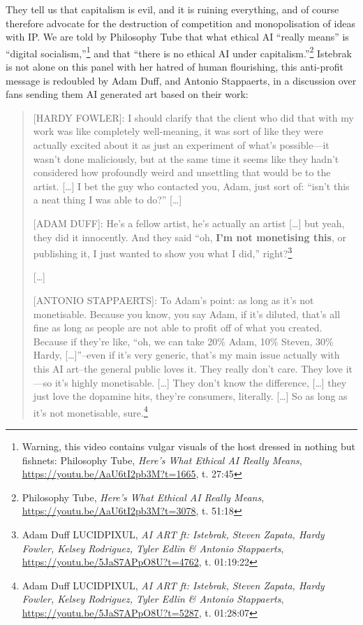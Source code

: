 \documentclass[11pt]{article}
\begin{document}
They tell us that capitalism is evil, and it is ruining everything, and of course therefore advocate for the destruction of competition and monopolisation of ideas with IP. We are told by Philosophy Tube that what ethical AI ``really means'' is ``digital socialism,''\footnote{Warning, this video contains vulgar visuals of the host dressed in nothing but fishnets: Philosophy Tube, \emph{Here's What Ethical AI Really Means}, \url{https://youtu.be/AaU6tI2pb3M?t=1665}, t. 27:45} and that ``there is no ethical AI under capitalism.''\footnote{Philosophy Tube, \emph{Here's What Ethical AI Really Means}, \url{https://youtu.be/AaU6tI2pb3M?t=3078}, t. 51:18} Istebrak is not alone on this panel with her hatred of human flourishing, this anti-profit message is redoubled by Adam Duff, and Antonio Stappaerts, in a discussion over fans sending them AI generated art based on their work:
\begin{quote}
[HARDY FOWLER]: I should clarify that the client who did that with my work was like completely well-meaning, it was sort of like they were actually excited about it as just an experiment of what's possible---it wasn't done maliciously, but at the same time it seems like they hadn't considered how profoundly weird and unsettling that would be to the artist. [\ldots{}] I bet the guy who contacted you, Adam, just sort of: ``isn't this a neat thing I was able to do?'' [\ldots{}]

[ADAM DUFF]: He's a fellow artist, he's actually an artist [\ldots{}] but yeah, they did it innocently. And they said ``oh, \textbf{I'm not monetising this}, or publishing it, I just wanted to show you what I did,'' right?\footnote{Adam Duff LUCIDPIXUL, \emph{AI ART ft: Istebrak, Steven Zapata, Hardy Fowler, Kelsey Rodriguez, Tyler Edlin \& Antonio Stappaerts}, \url{https://youtu.be/5JaS7APpO8U?t=4762}, t. 01:19:22}

[\ldots{}]

[ANTONIO STAPPAERTS]: To Adam's point: as long as it's not monetisable. Because you know, you say Adam, if it's diluted, that's all fine as long as people are not able to profit off of what you created. Because if they're like, ``oh, we can take 20\% Adam, 10\% Steven, 30\% Hardy, [\ldots{}]''--even if it's very generic, that's my main issue actually with this AI art--the general public loves it. They really don't care. They love it---so it's highly monetisable. [\ldots{}] They don't know the difference, [\ldots{}] they just love the dopamine hits, they're consumers, literally. [\ldots{}] So as long as it's not monetisable, sure.\footnote{Adam Duff LUCIDPIXUL, \emph{AI ART ft: Istebrak, Steven Zapata, Hardy Fowler, Kelsey Rodriguez, Tyler Edlin \& Antonio Stappaerts}, \url{https://youtu.be/5JaS7APpO8U?t=5287}, t. 01:28:07}
\end{quote}
\end{document}
